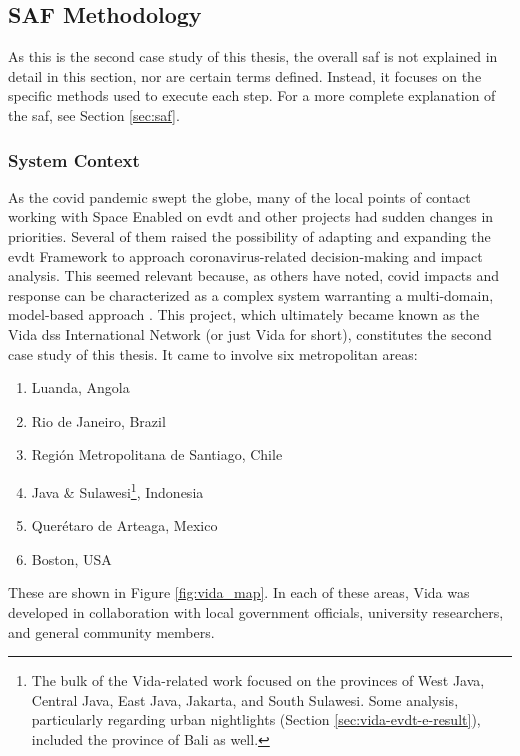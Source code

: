\subsection{SAF Methodology} \label{sec:vida-saf-method}

As this is the second case study of this thesis, the overall \ac{saf} is not explained in detail in this section, nor are certain terms defined. Instead, it focuses on the specific methods used to execute each step. For a more complete explanation of the \ac{saf}, see Section \ref{sec:saf}.

\subsubsection{System Context}

As the \ac{covid} pandemic swept the globe, many of the local points of contact working with Space Enabled on \ac{evdt} and other projects had sudden changes in priorities. Several of them raised the possibility of adapting and expanding the \ac{evdt} Framework to approach coronavirus-related decision-making and impact analysis. This seemed relevant because, as others have noted, \ac{covid} impacts and response can be characterized as a complex system warranting a multi-domain, model-based approach \cite{deweckHandlingCOVID192020}. This project,  which ultimately became known as the Vida \ac{dss} International Network (or just Vida for short), constitutes the second case study of this thesis. It came to involve six metropolitan areas:

\begin{enumerate}[itemsep=0pt,parsep=0pt]
    \item{Luanda, Angola}
    \item Rio de Janeiro, Brazil
    \item Región Metropolitana de Santiago, Chile
    \item{Java \& Sulawesi\footnote{The bulk of the Vida-related work focused on the provinces of West Java, Central Java, East Java, Jakarta, and South Sulawesi. Some analysis, particularly regarding urban nightlights (Section \ref{sec:vida-evdt-e-result}), included the province of Bali as well.}, Indonesia}
    \item{Querétaro de Arteaga, Mexico}
    \item{Boston, USA}
\end{enumerate}

These are shown in Figure \ref{fig:vida_map}. In each of these areas, Vida was developed in collaboration with local government officials, university researchers, and general community members. 

